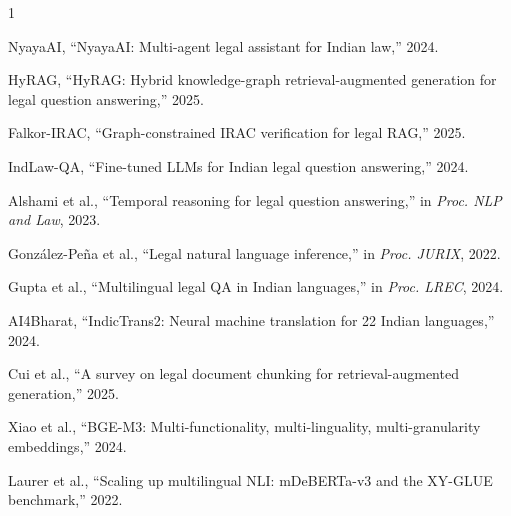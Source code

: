 \documentclass[conference]{IEEEtran}
\begin{document}

\begin{thebibliography}{1}

NyayaAI, ``NyayaAI: Multi-agent legal assistant for Indian law,'' 2024.

HyRAG, ``HyRAG: Hybrid knowledge-graph retrieval-augmented generation for legal question answering,'' 2025.

Falkor-IRAC, ``Graph-constrained IRAC verification for legal RAG,'' 2025.

IndLaw-QA, ``Fine-tuned LLMs for Indian legal question answering,'' 2024.

Alshami et al., ``Temporal reasoning for legal question answering,'' in \emph{Proc. NLP and Law}, 2023.

Gonz\'{a}lez-Pe{\~n}a et al., ``Legal natural language inference,'' in \emph{Proc. JURIX}, 2022.

Gupta et al., ``Multilingual legal QA in Indian languages,'' in \emph{Proc. LREC}, 2024.

AI4Bharat, ``IndicTrans2: Neural machine translation for 22 Indian languages,'' 2024.

Cui et al., ``A survey on legal document chunking for retrieval-augmented generation,'' 2025.

Xiao et al., ``BGE-M3: Multi-functionality, multi-linguality, multi-granularity embeddings,'' 2024.

Laurer et al., ``Scaling up multilingual NLI: mDeBERTa-v3 and the XY-GLUE benchmark,'' 2022.

\end{thebibliography}
\end{document}
